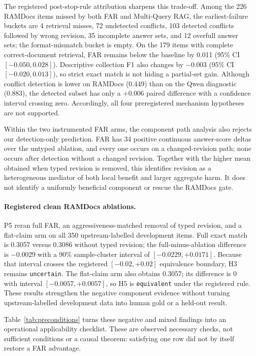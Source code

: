 \documentclass[letterpaper]{article}
\begin{document}
The registered post-stop-rule attribution sharpens this trade-off. Among the
226 RAMDocs items missed by both FAR and Multi-Query RAG, the earliest-failure
buckets are 4 retrieval misses, 72 undetected conflicts, 103 detected conflicts
followed by wrong revision, 35 incomplete answer sets, and 12 overfull answer
sets; the format-mismatch bucket is empty. On the 179 items with complete
correct-document retrieval, FAR remains below the baseline by 0.011 (95\% CI
$[-0.050,0.028]$). Descriptive collection F1 also changes by $-0.003$ (95\% CI
$[-0.020,0.013]$), so strict exact match is not hiding a partial-set gain.
Although conflict detection is lower on RAMDocs (0.449) than on the Qwen
diagnostic (0.883), the detected subset has only a $+0.006$ paired difference
with a confidence interval crossing zero. Accordingly, all four preregistered
mechanism hypotheses are not supported.

Within the two instrumented FAR arms, the component path analysis also rejects
our detection-only prediction. FAR has
34 positive continuous answer-score deltas over the untyped ablation, and every
one occurs on a changed-revision path; none occurs after detection without a
changed revision. Together with the higher mean obtained when typed revision is
removed, this identifies revision as a heterogeneous mediator of both local
benefit and larger aggregate harm. It does not identify a uniformly beneficial
component or rescue the RAMDocs gate.

\paragraph{Registered clean RAMDocs ablations.}
P5 reran full FAR, an aggressiveness-matched removal of typed revision, and a
flat-claim arm on all 350 upstream-labelled development items. Full exact match
is 0.3057 versus 0.3086 without typed revision; the full-minus-ablation
difference is $-0.0029$ with a 90\% sample-cluster interval of
$[-0.0229,+0.0171]$. Because that interval crosses the registered
$[-0.02,+0.02]$ equivalence boundary, H3 remains \texttt{uncertain}. The
flat-claim arm also obtains 0.3057; its difference is 0 with interval
$[-0.0057,+0.0057]$, so H5 is \texttt{equivalent} under the registered rule.
These results strengthen the negative component evidence without turning
upstream-labelled development data into human gold or a held-out result.

Table~\ref{tab:preconditions} turns these negative and mixed findings into an
operational applicability checklist. These are observed necessary checks, not
sufficient conditions or a causal theorem: satisfying one row did not by itself
restore a FAR advantage.
\end{document}
